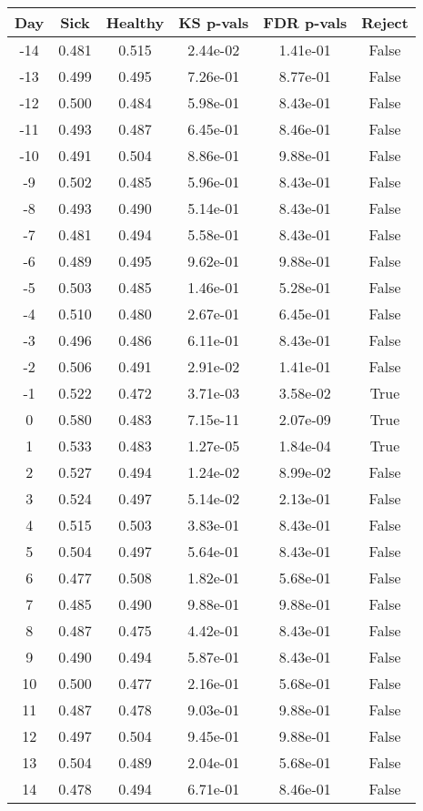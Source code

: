\begin{tabular}{c|c|c|c|c|c}
Day &  Sick & Healthy &  KS p-vals & FDR p-vals & Reject\\
\hline
-14 & 0.481 &   0.515 &   2.44e-02 &   1.41e-01 &  False\\
-13 & 0.499 &   0.495 &   7.26e-01 &   8.77e-01 &  False\\
-12 & 0.500 &   0.484 &   5.98e-01 &   8.43e-01 &  False\\
-11 & 0.493 &   0.487 &   6.45e-01 &   8.46e-01 &  False\\
-10 & 0.491 &   0.504 &   8.86e-01 &   9.88e-01 &  False\\
 -9 & 0.502 &   0.485 &   5.96e-01 &   8.43e-01 &  False\\
 -8 & 0.493 &   0.490 &   5.14e-01 &   8.43e-01 &  False\\
 -7 & 0.481 &   0.494 &   5.58e-01 &   8.43e-01 &  False\\
 -6 & 0.489 &   0.495 &   9.62e-01 &   9.88e-01 &  False\\
 -5 & 0.503 &   0.485 &   1.46e-01 &   5.28e-01 &  False\\
 -4 & 0.510 &   0.480 &   2.67e-01 &   6.45e-01 &  False\\
 -3 & 0.496 &   0.486 &   6.11e-01 &   8.43e-01 &  False\\
 -2 & 0.506 &   0.491 &   2.91e-02 &   1.41e-01 &  False\\
 -1 & 0.522 &   0.472 &   3.71e-03 &   3.58e-02 &   True\\
  0 & 0.580 &   0.483 &   7.15e-11 &   2.07e-09 &   True\\
  1 & 0.533 &   0.483 &   1.27e-05 &   1.84e-04 &   True\\
  2 & 0.527 &   0.494 &   1.24e-02 &   8.99e-02 &  False\\
  3 & 0.524 &   0.497 &   5.14e-02 &   2.13e-01 &  False\\
  4 & 0.515 &   0.503 &   3.83e-01 &   8.43e-01 &  False\\
  5 & 0.504 &   0.497 &   5.64e-01 &   8.43e-01 &  False\\
  6 & 0.477 &   0.508 &   1.82e-01 &   5.68e-01 &  False\\
  7 & 0.485 &   0.490 &   9.88e-01 &   9.88e-01 &  False\\
  8 & 0.487 &   0.475 &   4.42e-01 &   8.43e-01 &  False\\
  9 & 0.490 &   0.494 &   5.87e-01 &   8.43e-01 &  False\\
 10 & 0.500 &   0.477 &   2.16e-01 &   5.68e-01 &  False\\
 11 & 0.487 &   0.478 &   9.03e-01 &   9.88e-01 &  False\\
 12 & 0.497 &   0.504 &   9.45e-01 &   9.88e-01 &  False\\
 13 & 0.504 &   0.489 &   2.04e-01 &   5.68e-01 &  False\\
 14 & 0.478 &   0.494 &   6.71e-01 &   8.46e-01 &  False\\
\end{tabular}